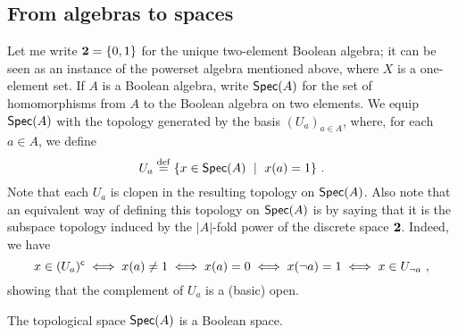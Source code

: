 \documentclass[a4paper]{article}
\begin{document}
\subsection{From algebras to spaces}
Let me write $\mathbf{2} = \{ 0, 1 \}$ for the unique two-element Boolean
algebra; it can be seen as  an instance of the powerset algebra mentioned
above, where $X$ is a one-element set. If $A$ is a Boolean algebra, write
$\operatorname*{\mathsf{Spec}}(A)$ for the set of homomorphisms from $A$ to the Boolean algebra on two
elements. We equip $\operatorname*{\mathsf{Spec}}(A)$ with the topology generated by the basis
$(U_a)_{a \in A}$, where, for each $a \in A$, we define
\[ U_a \isdef \{ x \in \Spec(A) \ \mid \ x(a) = \one \} \ . \]
Note that each $U_a$ is clopen in the resulting topology on $\operatorname*{\mathsf{Spec}}(A)$. 
Also note that an equivalent way of defining this topology on $\operatorname*{\mathsf{Spec}}(A)$ is by
saying that it is the subspace topology induced by the $|A|$-fold power of the
discrete space $\mathbf{2}$. 
Indeed,
we have 
\[ x \in (U_a)^{\mathsf{c}} \iff x(a) \neq 1 \iff x(a) = 0 \iff x(\neg a) = 1
\iff x \in U_{\neg a} \ , \]
showing that the complement of $U_a$ is a (basic) open.
\begin{theorem}
    The topological space $\operatorname*{\mathsf{Spec}}(A)$ is a Boolean space.
\end{theorem}
\end{document}
